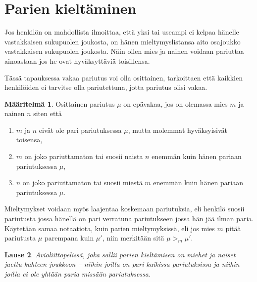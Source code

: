 \documentclass[finnish]{tktltiki2}
\newtheorem{lau}{Lause}
\theoremstyle{definition}
\newtheorem{maar}[lau]{Määritelmä}
\theoremstyle{remark}
\begin{document}
\section{Parien kieltäminen}
Jos henkilön on mahdollista ilmoittaa, että yksi tai useampi ei kelpaa hänelle vastakkaisen sukupuolen joukosta, on hänen mieltymyslistansa aito osajoukko vastakkaisen sukupuolen joukosta. Näin ollen mies ja nainen voidaan pariuttaa ainoastaan jos he ovat hyväksyttäviä toisillensa.

Tässä tapauksessa vakaa pariutus voi olla osittainen, tarkoittaen että kaikkien henkilöiden ei tarvitse olla pariutettuna, jotta pariutus olisi vakaa.

\begin{maar}
Osittainen pariutus $\mu$ on epävakaa, jos on olemassa mies $m$ ja nainen $n$ siten että
\begin{enumerate}
	\item $m$ ja $n$ eivät ole pari pariutuksessa $\mu$, mutta molemmat hyväksyisivät toisensa,
	\item $m$ on joko pariuttamaton tai suosii naista $n$ enemmän kuin hänen pariaan pariutuksessa $\mu$,
	\item $n$ on joko pariuttamaton tai suosii miestä $m$ enemmän kuin hänen pariaan pariutuksessa $\mu$.
\end{enumerate} 
\end{maar}

Mieltymykset voidaan myös laajentaa koskemaan pariutuksia, eli henkilö suosii pariutusta jossa hänellä on pari verratuna pariutukseen jossa hän jää ilman paria. Käytetään samaa notaatiota, kuin parien mieltymyksissä, eli jos mies $m$ pitää pariutusta $\mu$ parempana kuin $\mu'$, niin merkitään sitä $\mu >_m \mu'$.

\begin{lau}
Avioliittopelissä, joka sallii parien kieltämisen on miehet ja naiset jaettu kahteen joukkoon -- niihin joilla on pari kaikissa pariutuksissa ja niihin joilla ei ole yhtään paria missään pariutuksessa.
\end{lau}
\end{document}
